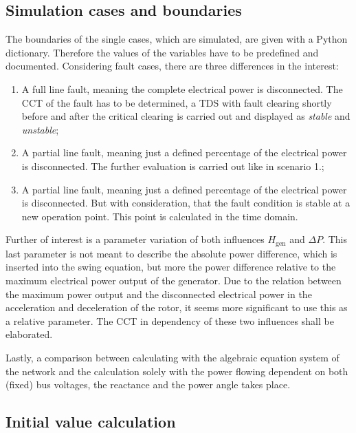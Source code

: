 \subsection{Simulation cases and boundaries}
\label{sec:sim-boundaries}

The boundaries of the single cases, which are simulated, are given with a Python dictionary. Therefore the values of the variables have to be predefined and documented. Considering fault cases, there are three differences in the interest:
\begin{enumerate}
        \item A full line fault, meaning the complete electrical power is disconnected. The \acs{CCT} of the fault has to be determined, a \acs{TDS} with fault clearing shortly before and after the critical clearing is carried out and displayed as {\itshape stable} and {\itshape unstable};
        \item A partial line fault, meaning just a defined percentage of the electrical power is disconnected. The further evaluation is carried out like in scenario 1.;
        \item A partial line fault, meaning just a defined percentage of the electrical power is disconnected. But with consideration, that the fault condition is stable at a new operation point. This point is calculated in the time domain.
\end{enumerate}
Further of interest is a parameter variation of both influences $H_\mathrm{gen}$ and $\Delta P$. This last parameter is not meant to describe the absolute power difference, which is inserted into the swing equation, but more the power difference relative to the maximum electrical power output of the generator. Due to the relation between the maximum power output and the disconnected electrical power in the acceleration and deceleration of the rotor, it seems more significant to use this as a relative parameter. The \acs{CCT} in dependency of these two influences shall be elaborated.

Lastly, a comparison between calculating with the algebraic equation system of the network and the calculation solely with the power flowing dependent on both (fixed) bus voltages, the reactance and the power angle takes place.

\subsection{Initial value calculation}

